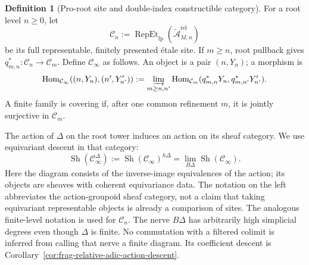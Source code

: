 \documentclass[11pt]{article}
\theoremstyle{definition}
\newtheorem{definition}[theorem]{Definition}
\theoremstyle{remark}
\begin{document}
\begin{definition}[Pro-root site and double-index constructible category]
\label{def:frag-restricted-root-site}
For a root level $n\geq0$, let
\[
 \mathcal C_n:=
 \operatorname{RepEt}_{\mathrm{fp}}
 (\widetilde{\mathcal A}_{M,n}^{\mathrm{rel}})
\]
be its full representable, finitely presented \'{e}tale site.  If $m\geq n$,
root pullback gives $q_{m,n}^*:\mathcal C_n\to\mathcal C_m$.  Define
$\mathcal C_\infty$ as follows.  An object is a pair $(n,Y_n)$; a morphism is
\[
 \operatorname{Hom}_{\mathcal C_\infty}((n,Y_n),(n',Y'_{n'}))
 :=\varinjlim_{m\geq n,n'}
 \operatorname{Hom}_{\mathcal C_m}
 (q_{m,n}^*Y_n,q_{m,n'}^*Y'_{n'}).
\]
A finite family is covering if, after one common refinement $m$, it is jointly
surjective in $\mathcal C_m$.

The action of $\Delta$ on the root tower induces an action on its sheaf
category.  We use equivariant descent in that category:
\begin{equation}
\operatorname{Sh}(\mathcal C_\infty^\Delta)
:=\operatorname{Sh}(\mathcal C_\infty)^{h\Delta}
=\operatorname*{lim}_{B\Delta}\operatorname{Sh}(\mathcal C_\infty).
\label{eq:frag-delta-site-definition}
\end{equation}
Here the diagram consists of the inverse-image equivalences of the action;
its objects are sheaves with coherent equivariance data.  The notation on
the left abbreviates the action-groupoid sheaf category, not a claim that
taking equivariant representable objects is already a comparison of sites.
The analogous finite-level notation is used for $\mathcal C_n$.
The nerve $B\Delta$ has arbitrarily high simplicial degrees even though
$\Delta$ is finite.  No commutation with a filtered colimit is inferred from
calling that nerve a finite diagram.  Its coefficient descent is Corollary~\ref{cor:frag-relative-adic-action-descent}.


\end{definition}
\end{document}
